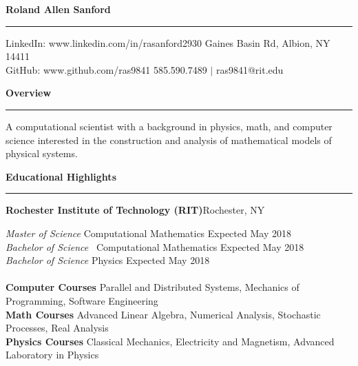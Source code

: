 \documentclass{article}
\newcommand{\fullbar}{\rule{\textwidth}{0.4pt}} %
\newcommand{\heading}[1]{{\Large\textbf{#1}\vspace{-.2cm}\newline\fullbar}} %
\newcommand{\secspace}{.3 cm}
\begin{document}
\heading{Roland Allen Sanford}
LinkedIn: \hspace{.14cm}www.linkedin.com/in/rasanford\hfill	2930 Gaines Basin Rd, Albion, NY 14411\\
GitHub: \quad www.github.com/ras9841 \hfill 585.590.7489 $|$ ras9841@rit.edu
\vspace{.4cm}
	
\heading{Overview}
\begin{flushleft}
	A computational scientist with a background in physics, math, and computer science interested in the construction and analysis of mathematical models of physical systems.
\end{flushleft}  

\vspace{\secspace}
\heading{Educational Highlights}
\begin{flushleft}
	\textbf{Rochester Institute of Technology (RIT)}\hfill Rochester, NY
\end{flushleft}
\textit{Master of Science} \hfill \quad Computational Mathematics \hfill Expected May 2018 \\
\textit{Bachelor of Science} \hfill \ Computational Mathematics \hfill Expected May 2018 \\
\textit{Bachelor of Science} \hfill Physics \hfill Expected May 2018 \\\\
\textbf{Computer Courses} \hfill Parallel and Distributed Systems, Mechanics of Programming, Software Engineering\\
\textbf{Math Courses} \hfill Advanced Linear Algebra, Numerical Analysis, Stochastic Processes, Real Analysis\\
\textbf{Physics Courses} \hfill Classical Mechanics, Electricity and Magnetism, Advanced Laboratory in Physics\\
\end{document}
